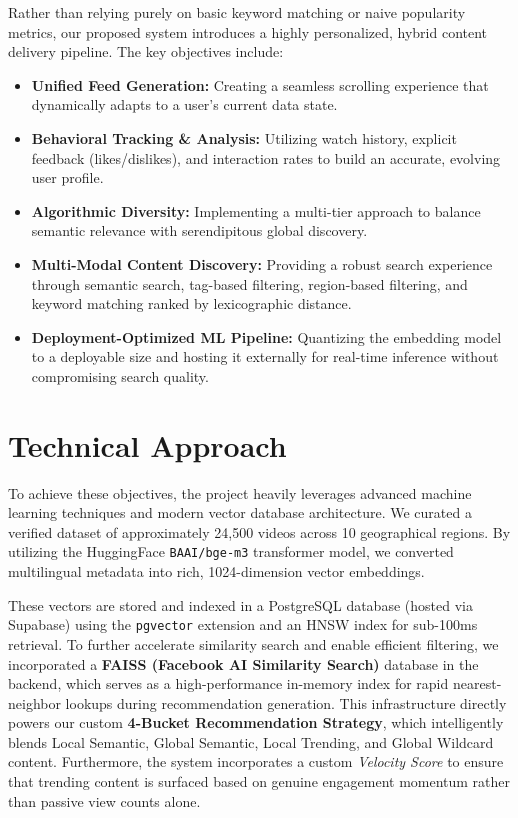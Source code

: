 \documentclass[11pt, a4paper]{report}
\begin{document}
Rather than relying purely on basic keyword matching or naive popularity metrics, our proposed system introduces a highly personalized, hybrid content delivery pipeline. The key objectives include:
\begin{itemize}
    \item \textbf{Unified Feed Generation:} Creating a seamless scrolling experience that dynamically adapts to a user's current data state.
    \item \textbf{Behavioral Tracking \& Analysis:} Utilizing watch history, explicit feedback (likes/dislikes), and interaction rates to build an accurate, evolving user profile.
    \item \textbf{Algorithmic Diversity:} Implementing a multi-tier approach to balance semantic relevance with serendipitous global discovery.
    \item \textbf{Multi-Modal Content Discovery:} Providing a robust search experience through semantic search, tag-based filtering, region-based filtering, and keyword matching ranked by lexicographic distance.
    \item \textbf{Deployment-Optimized ML Pipeline:} Quantizing the embedding model to a deployable size and hosting it externally for real-time inference without compromising search quality.
\end{itemize}

\section{Technical Approach}
To achieve these objectives, the project heavily leverages advanced machine learning techniques and modern vector database architecture. We curated a verified dataset of approximately 24,500 videos across 10 geographical regions. By utilizing the HuggingFace \texttt{BAAI/bge-m3} transformer model, we converted multilingual metadata into rich, 1024-dimension vector embeddings. 

These vectors are stored and indexed in a PostgreSQL database (hosted via Supabase) using the \texttt{pgvector} extension and an HNSW index for sub-100ms retrieval. To further accelerate similarity search and enable efficient filtering, we incorporated a \textbf{FAISS (Facebook AI Similarity Search)} database in the backend, which serves as a high-performance in-memory index for rapid nearest-neighbor lookups during recommendation generation. This infrastructure directly powers our custom \textbf{4-Bucket Recommendation Strategy}, which intelligently blends Local Semantic, Global Semantic, Local Trending, and Global Wildcard content. Furthermore, the system incorporates a custom \textit{Velocity Score} to ensure that trending content is surfaced based on genuine engagement momentum rather than passive view counts alone.
\end{document}
